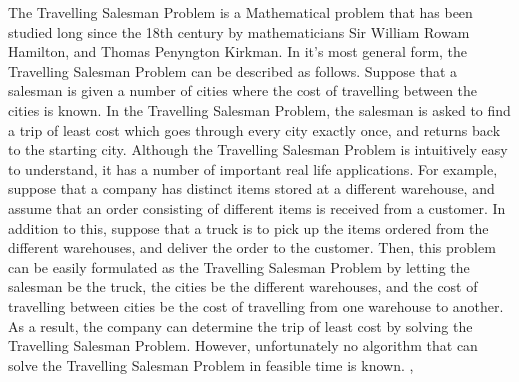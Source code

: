 \documentclass[12pt]{article}
\numberwithin{equation}{subsection}
\numberwithin{table}{subsection}
\numberwithin{algorithm}{subsection}
\begin{document}
The Travelling Salesman Problem is a Mathematical problem that has been studied long since the 18th century by mathematicians Sir William Rowam Hamilton, and Thomas Penyngton Kirkman. In it's most general form, the Travelling Salesman Problem can be described as follows. Suppose that a salesman is given a number of cities where the cost of travelling between the cities is known. In the Travelling Salesman Problem, the salesman is asked to find a trip of least cost which goes through every city exactly once, and returns back to the starting city. Although the Travelling Salesman Problem is intuitively easy to understand, it has a number of important real life applications. For example, suppose that a company has distinct items stored at a different warehouse, and assume that an order consisting of different items is received from a customer. In addition to this, suppose that a truck is to pick up the items ordered from the different warehouses, and deliver the order to the customer. Then, this problem can be easily formulated as the Travelling Salesman Problem by letting the salesman be the truck, the cities be the different warehouses, and the cost of travelling between cities be the cost of travelling from one warehouse to another. As a result, the company can determine the trip of least cost by solving the Travelling Salesman Problem. However,  unfortunately no algorithm that can solve the Travelling Salesman Problem in feasible time is known. \cite{dorigo_stutzle_thomas_2004}, \cite{Matai10}\\\\
\end{document}
